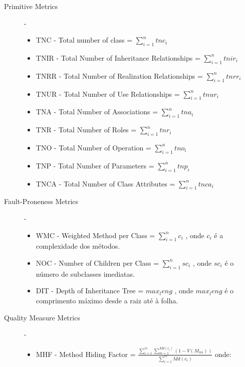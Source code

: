 \begin{description}
 \item [Primitive Metrics] - \begin{itemize}
				\item TNC - Total number of class  = $ \sum_{i=1}^{n} tnc_i $
				\item TNIR - Total Number of Inheritance Relationships  = $ \sum_{i=1}^{n} tnir_i $
				\item TNRR - Total Number of Realization Relationships  = $ \sum_{i=1}^{n} tnrr_i $
				\item TNUR - Total Number of Use Relationships  = $ \sum_{i=1}^{n} tnur_i $
				\item TNA - Total Number of Associations  = $ \sum_{i=1}^{n} tna_i $
				\item TNR - Total Number of Roles  = $ \sum_{i=1}^{n} tnr_i $
				\item TNO - Total Number of Operation  = $ \sum_{i=1}^{n} tno_i $
				\item TNP - Total Number of Parameters  = $ \sum_{i=1}^{n} tnp_i $
				\item TNCA - Total Number of Class Attributes  = $ \sum_{i=1}^{n} tnca_i $
			    \end{itemize}
 \item [Fault-Proneness Metrics] - \begin{itemize}
                                   \item WMC - Weighted Method per Class  = $ \sum_{i=1}^{n} c_i $ , onde $c_i$ é a complexidade dos métodos.
				   \item NOC - Number of Children per Class = $ \sum_{i=1}^{n} sc_i $ , onde $sc_i$ é o número de subclasses imediatas.
				   \item DIT - Depth of Inheritance Tree  = $ max_leng $ , onde $ max_leng $ é o comprimento máximo desde a raiz até à folha.
                                  \end{itemize}
 \item [Quality Measure Metrics] - \begin{itemize}
                                   \item MHF - Method Hiding Factor = $ \frac{\sum_{i=1}^{rc} \sum_{m=1}^{Md(c_i)} (1-V(M_{mi}))} {\sum_{i=1}^{rc} Md(c_i)} $ onde: 
\end{itemize}
\end{description}
